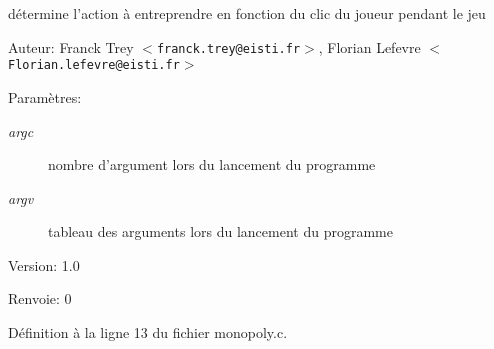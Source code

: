 d\'{e}termine l'action \`{a} entreprendre en fonction du clic du joueur pendant le jeu 

\begin{Desc}
\item[Auteur:]Franck Trey $<${\tt franck.trey@eisti.fr}$>$, Florian Lefevre $<${\tt Florian.lefevre@eisti.fr}$>$\end{Desc}
\begin{Desc}
\item[Param\`{e}tres:]
\begin{description}
\item[{\em argc}]nombre d'argument lors du lancement du programme \item[{\em argv}]tableau des arguments lors du lancement du programme\end{description}
\end{Desc}
\begin{Desc}
\item[Version:]1.0 \end{Desc}
\begin{Desc}
\item[Renvoie:]0 \end{Desc}


D\'{e}finition \`{a} la ligne 13 du fichier monopoly.c.

